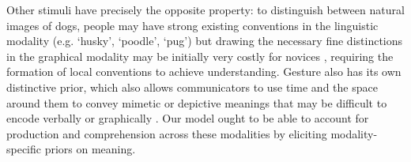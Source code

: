 Other stimuli have precisely the opposite property: to distinguish between natural images of dogs, people may have strong existing conventions in the linguistic modality (e.g. `husky', `poodle', `pug') but drawing the necessary fine distinctions in the graphical modality may be initially very costly for novices \cite{fan2020pragmatic}, requiring the formation of local conventions to achieve understanding. 
Gesture also has its own distinctive prior, which also allows communicators to use time and the space around them to convey mimetic or depictive meanings that may be difficult to encode verbally or graphically \cite{goldin-meadow_role_1999,clark2016depicting,mcneill1992hand}. 
Our model ought to be able to account for production and comprehension across these modalities by eliciting modality-specific priors on meaning.



